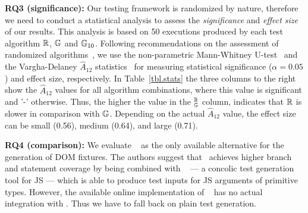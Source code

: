 \textbf{RQ3 (significance):} Our testing framework is randomized by nature, therefore we need to conduct a statistical analysis to assess the \emph{significance} and \emph{effect size} of our results. This analysis is based on 50 executions produced by each test algorithm $\mathbb{R}$, $\mathbb{G}$ and $\mathbb{G}_{10}$. Following recommendations on the assessment of randomized algorithms~\cite{arcuri2011practical}, we use the non-parametric Mann-Whitney U-test~\cite{mann1947test} and the Vargha-Delaney $\hat{A}_{12}$ statistics~\cite{vargha2000critique} for measuring statistical significance ($\alpha=0.05$) and effect size, respectively. In Table~\ref{tbl.stats} the three columns to the right show the $\hat{A}_{12}$ values for all algorithm combinations, where this value is significant and '-' otherwise. Thus, the higher the value in the $_{\mathbb{G}}^{\mathbb{R}}$ column, indicates that $\mathbb{R}$ is slower in comparison with $\mathbb{G}$. Depending on the actual $\hat{A}_{12}$ value, the effect size can be small (0.56), medium (0.64), and large (0.71).\\

\textbf{RQ4 (comparison):} We evaluate \Confix~\cite{amin:ase15} as the only available alternative for the generation of DOM fixtures. The authors suggest that \Confix\ achieves higher branch and statement coverage by being combined with \Jalangi~\cite{sen2013jalangi} --- a concolic test generation tool for JS --- which is able to produce test inputs for JS arguments of primitive types. However, the available online implementation of \Confix~\cite{confixgit} has no actual integration with \Jalangi. Thus we have to fall back on plain \Confix test generation.

